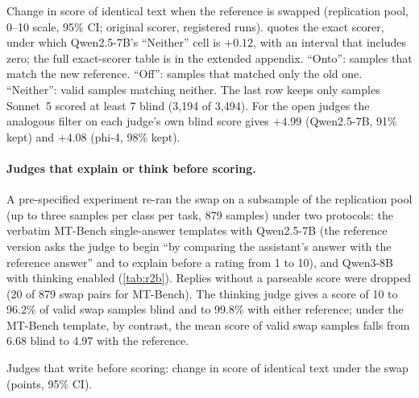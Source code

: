 \begin{table}[htbp]
\centering
\caption{Change in score of identical text when the reference is swapped (replication pool, 0--10 scale, 95\% CI; original scorer, registered runs).\pre{}  quotes the exact scorer, under which Qwen2.5-7B's ``Neither'' cell is $+0.12$, with an interval that includes zero; the full exact-scorer table is in the extended appendix. ``Onto'': samples that match the new reference. ``Off'': samples that matched only the old one. ``Neither'': valid samples matching neither. The last row keeps only samples Sonnet~5 scored at least 7 blind (3,194 of 3,494). For the open judges the analogous filter on each judge's own blind score gives $+4.99$  (Qwen2.5-7B, 91\% kept) and $+4.08$ (phi-4, 98\% kept).\ph}
\label{tab:rotation}
\footnotesize
\setlength{\tabcolsep}{3pt}
\begin{adjustbox}{max width=\linewidth}\end{adjustbox}
\end{table}

\paragraph{Judges that explain or think before scoring.}
A pre-specified experiment re-ran the swap on a subsample of the replication pool (up to three samples per class per task, 879 samples) under two protocols: the verbatim MT-Bench single-answer templates with Qwen2.5-7B (the reference version asks the judge to begin ``by comparing the assistant's answer with the reference answer'' and to explain before a rating from 1 to 10), and Qwen3-8B with thinking enabled (\cref{tab:r2b}). Replies without a parseable score were dropped (20 of 879 swap pairs for MT-Bench). The thinking judge gives a score of 10 to 96.2\% of valid swap samples blind and to 99.8\% with either reference; under the MT-Bench template, by contrast, the mean score of valid swap samples falls from 6.68 blind to 4.97 with the reference.\ph

\begin{table}[htbp]
\centering
\caption{Judges that write before scoring: change in score of identical text under the swap (points, 95\% CI).\pre}
\label{tab:r2b}
\footnotesize
\setlength{\tabcolsep}{3pt}
\begin{adjustbox}{max width=\linewidth}\end{adjustbox}
\end{table}

